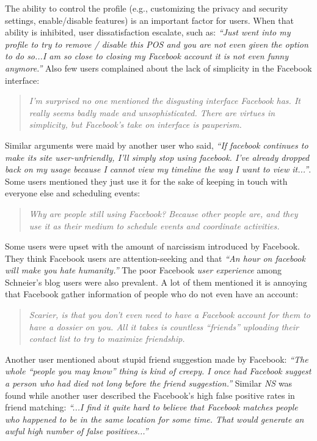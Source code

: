     The ability to control the profile (e.g., customizing the privacy and security settings, enable/disable features) is an important factor for users. When that ability is inhibited, user dissatisfaction escalate, such as: \textit{``Just went into my profile to try to remove / disable this POS and you are not even given the option to do so...I am so close to closing my Facebook account it is not even funny anymore.''} Also few users complained about the lack of simplicity in the Facebook interface:
    \begin{quote}
         \textit{I'm surprised no one mentioned the disgusting interface Facebook has. It really seems badly made and unsophisticated. There are virtues in simplicity, but Facebook's take on interface is pauperism.}
    \end{quote}
    
    Similar arguments were maid by another user who said, \textit{``If facebook continues to make its site user-unfriendly, I'll simply stop using facebook. I've already dropped back on my usage because I cannot view my timeline the way I want to view it...''}. Some users mentioned they just use it for the sake of keeping in touch with everyone else and scheduling events:
    \begin{quote}
         \textit{Why are people still using Facebook? Because other people are, and they use it as their medium to schedule events and coordinate activities. }
    \end{quote}
    
    Some users were upset with the amount of narcissism introduced by Facebook. They think Facebook users are attention-seeking and that \textit{``An hour on facebook will make you hate humanity.''} 
The poor Facebook \textit{user experience} among Schneier's blog users were also prevalent. A lot of them mentioned it is annoying that Facebook gather information of people who do not even have an account:

\begin{quote}
         \textit{Scarier, is that you don't even need to have a Facebook account for them to have a dossier on you. All it takes is countless ``friends'' uploading their contact list to try to maximize friendship. }

         
\end{quote}

Another user mentioned about stupid friend suggestion made by Facebook: \textit{``The whole ``people you may know'' thing is kind of creepy. I once had Facebook suggest a person who had died not long before the friend suggestion.''} Similar \emph{NS} was found while another user described the Facebook's high false positive rates in friend matching: \textit{``...I find it quite hard to believe that Facebook matches people who happened to be in the same location for some time. That would generate an awful high number of false positives...''} 
    
